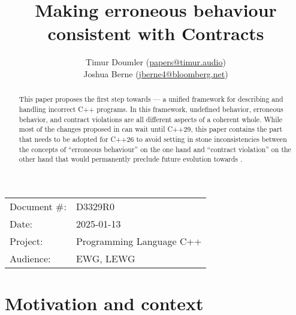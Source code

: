 \title{Making erroneous behaviour consistent with Contracts}
\author{
Timur Doumler \small(\href{mailto:papers@timur.audio}{papers@timur.audio}) \\
Joshua Berne \small(\href{mailto:jberne4@bloomberg.net}{jberne4@bloomberg.net}) \\
}
\date{}
\maketitle

\begin{tabular}{ll}
Document \#: & D3329R0 \\
Date: &2025-01-13 \\
Project: & Programming Language C++ \\
Audience: & EWG, LEWG
\end{tabular}

\begin{abstract}
This paper proposes the first step towards \cite{P3100R1} --- a unified framework for describing and handling incorrect C++ programs. In this framework, undefined behavior, erroneous behavior, and contract violations are all different aspects of a coherent whole. While most of the changes proposed in \cite{P3100R1} can wait until C++29, this paper contains the part that needs to be adopted for C++26 to avoid setting in stone inconsistencies between the concepts of ``erroneous behaviour'' on the one hand and ``contract violation'' on the other hand that would permanently preclude future evolution towards \cite{P3100R1}.
\end{abstract}








\section{Motivation and context}

